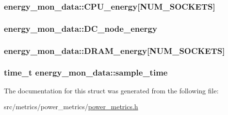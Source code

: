 \subsubsection[{\texorpdfstring{C\+P\+U\+\_\+energy}{CPU_energy}}]{ energy\+\_\+mon\+\_\+data\+::\+C\+P\+U\+\_\+energy\mbox{[}{\bf N\+U\+M\+\_\+\+S\+O\+C\+K\+E\+TS}\mbox{]}}\hypertarget{structenergy__mon__data_a764fefe8935c91ebd879060fec354f5b}{}\label{structenergy__mon__data_a764fefe8935c91ebd879060fec354f5b}
\subsubsection[{\texorpdfstring{D\+C\+\_\+node\+\_\+energy}{DC_node_energy}}]{ energy\+\_\+mon\+\_\+data\+::\+D\+C\+\_\+node\+\_\+energy}\hypertarget{structenergy__mon__data_ae5e6cf62edbf30b79410d3890c31a15b}{}\label{structenergy__mon__data_ae5e6cf62edbf30b79410d3890c31a15b}
\subsubsection[{\texorpdfstring{D\+R\+A\+M\+\_\+energy}{DRAM_energy}}]{ energy\+\_\+mon\+\_\+data\+::\+D\+R\+A\+M\+\_\+energy\mbox{[}{\bf N\+U\+M\+\_\+\+S\+O\+C\+K\+E\+TS}\mbox{]}}\hypertarget{structenergy__mon__data_ab1fa0dad6895713ce093f8422e4b2701}{}\label{structenergy__mon__data_ab1fa0dad6895713ce093f8422e4b2701}
\subsubsection[{\texorpdfstring{sample\+\_\+time}{sample_time}}]{\setlength{\rightskip}{0pt plus 5cm}time\+\_\+t energy\+\_\+mon\+\_\+data\+::sample\+\_\+time}\hypertarget{structenergy__mon__data_a1d6dcfd4286ede4a8bd270433a2203d0}{}\label{structenergy__mon__data_a1d6dcfd4286ede4a8bd270433a2203d0}


The documentation for this struct was generated from the following file\+:\begin{DoxyCompactItemize}
\item 
src/metrics/power\+\_\+metrics/\hyperlink{power__metrics_8h}{power\+\_\+metrics.\+h}\end{DoxyCompactItemize}

